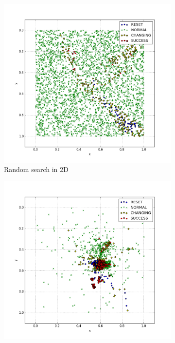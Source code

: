 \documentclass[times, utf8, diplomski]{fer}
\begin{document}
\begin{figure}
	\centering
	\begin{subfigure}[b]{0.49\textwidth}
		\includegraphics[width=0.98\linewidth]{images/plots/plot_random_2D.png}
		\caption{Random search in 2D}
		\label{fig:random1}
	\end{subfigure}
	\begin{subfigure}[b]{0.49\textwidth}
		\includegraphics[width=0.98\linewidth]{images/plots/plot_GA_3_2D.png}

\end{subfigure}
\end{figure}
\end{document}
